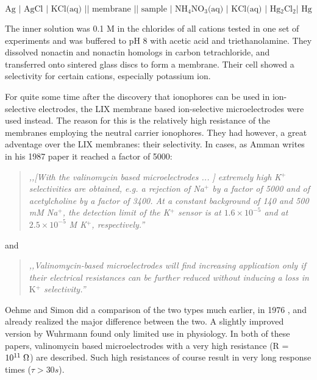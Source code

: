 \begin{equation}
\text{Ag | AgCl | KCl(aq) || membrane || sample | NH$_4$NO$_3$(aq) | KCl(aq) | Hg$_2$Cl$_2$| Hg}
\end{equation}

The inner solution was 0.1 M in the chlorides of all cations tested in one set of experiments and was buffered to pH 8 with acetic acid and triethanolamine.
They dissolved nonactin and nonactin homologs in carbon tetrachloride, and transferred onto sintered glass discs to form a membrane.
Their cell showed a selectivity for certain cations, especially potassium ion. 

For quite some time after the discovery that ionophores can be used in ion-selective electrodes, the LIX membrane based ion-selective microelectrodes were used instead.
The reason for this is the relatively high resistance of the membranes employing the neutral carrier ionophores.
They had however, a great adventage over the LIX membranes: their selectivity.
In cases, as Amman writes in his 1987 paper \cite{ammann1987valinomycin} it reached a factor of 5000:

\begin{quote}
\vspace{0.5cm}
\emph{,,[With the valinomycin based microelectrodes ... ] extremely high K$^+$ selectivities are obtained, e.g. a rejection of Na$^+$ by a factor of 5000 and of acetylcholine by a factor of 3400.
At a constant background of 140 and 500 mM Na$^+$, the detection limit of the K$^+$ sensor is at $1.6\times  10^{-5}$ and at $2.5\times 10^{-5}$ M K$^+$, respectively.''}
\vspace{0.5cm}
\end{quote}

and 

\begin{quote}
\vspace{0.5cm}
\emph{,,Valinomycin-based microelectrodes will find increasing application only if their electrical resistances can be further reduced without inducing a loss in} K\emph{$^+$ selectivity.''}
\vspace{0.5cm}
\end{quote}

Oehme and Simon did a comparison of the two types much earlier, in 1976 \cite{oehme1976microelectrode}, and already realized the major difference between the two.
A slightly improved version by Wuhrmann \cite{wuhrmann1979change} found only limited use in physiology.
In both of these papers, valinomycin based microelectrodes with a very high resistance (R = $10^{11}\; \ohm$) are described.
Such high resistances of course result in very long response times ($\tau > 30 s$). 

